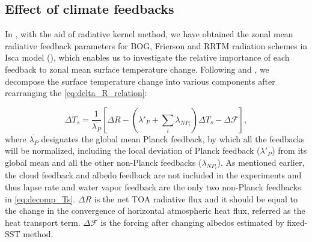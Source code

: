 \subsection{Effect of climate feedbacks}
\label{sec:climate_feedbacks_temp_decomp}


In , with the aid of radiative kernel method, we have obtained the zonal mean radiative feedback parameters for BOG, Frierson and RRTM radiation schemes in Isca model (), which enables us to investigate the relative importance of each feedback to zonal mean surface temperature change. Following \cite{Feldl2013} and \cite{Kim2018}, we decompose the surface temperature change into various components after rearranging the \eqref{eq:delta_R_relation}:


\begin{equation}
	\Delta T_s = \frac{1}{\overline{\lambda_P}}\left[\Delta R -\left(\lambda'_P+\sum_{i}\lambda_{NP_i}\right)\Delta T_s-\Delta \mathscr{F}\right],
	\label{eq:decomp_Ts}
\end{equation}
where $\overline{\lambda_P}$ designates the global mean Planck feedback, by which all the feedbacks will be normalized, including the local deviation of Planck feedback ($\lambda'_P$) from its global mean and all the other non-Planck feedbacks ($\lambda_{NP_i}$). As mentioned earlier, the cloud feedback and albedo feedback are not included in the experiments and thus lapse rate and water vapor feedback are the only two non-Planck feedbacks in \eqref{eq:decomp_Ts}. $\Delta R$ is the net TOA radiative flux and it should be equal to the change in the convergence of horizontal atmospheric heat flux, referred as the heat transport term. $\Delta \mathscr{F}$ is the forcing after changing albedos estimated by fixed-SST method.


